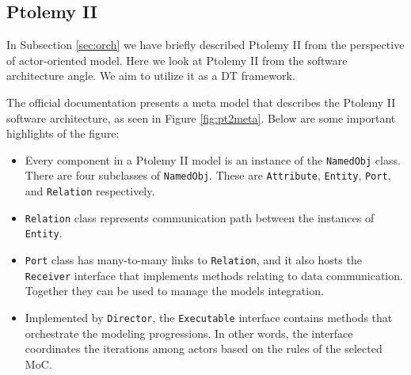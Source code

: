 \subsection{Ptolemy II}
In Subsection \ref{sec:orch} we have briefly described Ptolemy II from the perspective of actor-oriented model. Here we look at Ptolemy II from the software architecture angle. We aim to utilize it as a DT framework.

The official documentation \cite{Ptolemaeus2014} presents a meta model that describes the Ptolemy II software architecture, as seen in Figure \ref{fig:pt2meta}. Below are some important highlights of the figure:

\begin{itemize}
\item Every component in a Ptolemy II model is an instance of the \texttt{NamedObj} class. There are four subclasses of \texttt{NamedObj}. These are \texttt{Attribute}, \texttt{Entity}, \texttt{Port}, and \texttt{Relation} respectively.
\item \texttt{Relation} class represents communication path between the instances of \texttt{Entity}. 
\item \texttt{Port} class has many-to-many links to \texttt{Relation}, and it also hosts the \texttt{Receiver} interface that implements methods relating to data communication. Together they can be used to manage the models integration. 

\item Implemented by \texttt{Director}, the \texttt{Executable} interface contains methods that orchestrate the modeling progressions. In other words, the interface coordinates the iterations among actors based on the rules of the selected MoC.
\end{itemize}

